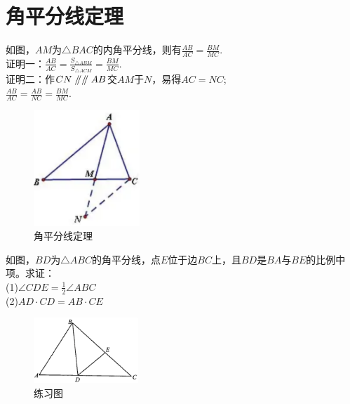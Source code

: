 \documentclass{ecnuthesis}
\newcommand\px{\mathrel{/\mkern-5mu/}}  %
\begin{document}
\section{角平分线定理}
\begin{model}
    如图，$AM$为$\triangle BAC$的内角平分线，则有$\frac{AB}{AC}=\frac{BM}{MC}.$ \\
    证明一：$\frac{AB}{AC}=\frac{S_{\triangle ABM}}{S_{\triangle ACM}}=\frac{BM}{MC}$. \\
    证明二：作$CN\px \px AB$交$AM$于$N$，易得$AC=NC$; \\
    $\frac{AB}{AC}=\frac{AB}{NC}=\frac{BM}{MC}.$
\end{model}
\begin{figure}[H]
\centering
\includegraphics[width=4cm]{picture/854.png}
\caption{角平分线定理}
\end{figure}
\begin{problem}
    如图，$BD$为$\triangle ABC$的角平分线，点$E$位于边$BC$上，且$BD$是$BA$与$BE$的比例中项。求证：\\
    (1)$\angle CDE=\frac{1}{2}\angle ABC$ \\
    (2)$AD·CD=AB·CE$
\end{problem}
\begin{figure}[H]
\centering
\includegraphics[width=4cm]{picture/811.png}
\caption{练习图}
\end{figure}
\clearpage
\end{document}
